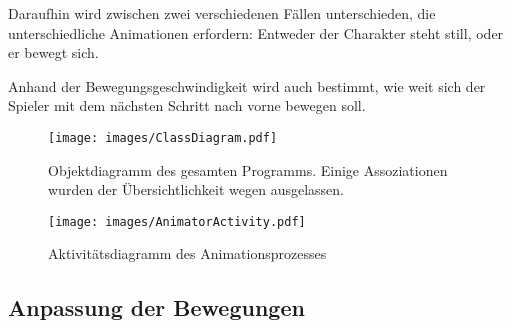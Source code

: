 Daraufhin wird zwischen zwei verschiedenen Fällen unterschieden, die unterschiedliche Animationen erfordern: Entweder der Charakter steht still, oder er bewegt sich.

Anhand der Bewegungsgeschwindigkeit wird auch bestimmt, wie weit sich der Spieler mit dem nächsten Schritt nach vorne bewegen soll.

\begin{landscape}
    \begin{figure}
        \texttt{[image: images/ClassDiagram.pdf]}
        \caption{Objektdiagramm des gesamten Programms. Einige Assoziationen wurden der Übersichtlichkeit wegen ausgelassen.}
        \label{uml_classes}
    \end{figure}
\end{landscape}

\begin{figure}
    \centering
    \texttt{[image: images/AnimatorActivity.pdf]}
    \caption{Aktivitätsdiagramm des Animationsprozesses}
    \label{uml_activity}
\end{figure}

\subsection{Anpassung der Bewegungen}



